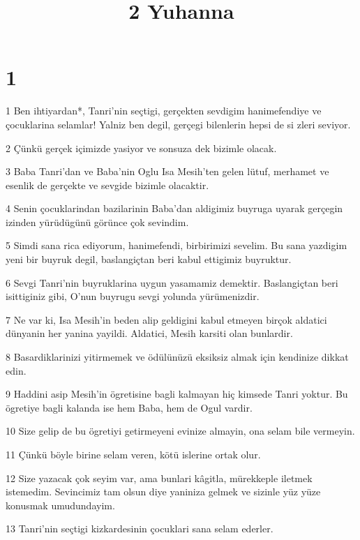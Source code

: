 

\title{2 Yuhanna}


\chapter{1}

\par 1 Ben ihtiyardan*, Tanri'nin seçtigi, gerçekten sevdigim hanimefendiye ve çocuklarina selamlar! Yalniz ben degil, gerçegi bilenlerin hepsi de si zleri seviyor.
\par 2 Çünkü gerçek içimizde yasiyor ve sonsuza dek bizimle olacak.
\par 3 Baba Tanri'dan ve Baba'nin Oglu Isa Mesih'ten gelen lütuf, merhamet ve esenlik de gerçekte ve sevgide bizimle olacaktir.
\par 4 Senin çocuklarindan bazilarinin Baba'dan aldigimiz buyruga uyarak gerçegin izinden yürüdügünü görünce çok sevindim.
\par 5 Simdi sana rica ediyorum, hanimefendi, birbirimizi sevelim. Bu sana yazdigim yeni bir buyruk degil, baslangiçtan beri kabul ettigimiz buyruktur.
\par 6 Sevgi Tanri'nin buyruklarina uygun yasamamiz demektir. Baslangiçtan beri isittiginiz gibi, O'nun buyrugu sevgi yolunda yürümenizdir.
\par 7 Ne var ki, Isa Mesih'in beden alip geldigini kabul etmeyen birçok aldatici dünyanin her yanina yayildi. Aldatici, Mesih karsiti olan bunlardir.
\par 8 Basardiklarinizi yitirmemek ve ödülünüzü eksiksiz almak için kendinize dikkat edin.
\par 9 Haddini asip Mesih'in ögretisine bagli kalmayan hiç kimsede Tanri yoktur. Bu ögretiye bagli kalanda ise hem Baba, hem de Ogul vardir.
\par 10 Size gelip de bu ögretiyi getirmeyeni evinize almayin, ona selam bile vermeyin.
\par 11 Çünkü böyle birine selam veren, kötü islerine ortak olur.
\par 12 Size yazacak çok seyim var, ama bunlari kâgitla, mürekkeple iletmek istemedim. Sevincimiz tam olsun diye yaniniza gelmek ve sizinle yüz yüze konusmak umudundayim.
\par 13 Tanri'nin seçtigi kizkardesinin çocuklari sana selam ederler.


